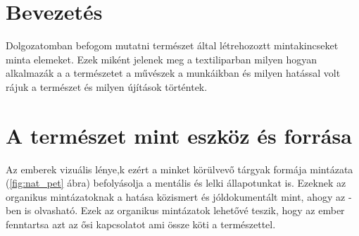 \documentclass[fontsize=12pt, appendixprefix=true]{scrreprt}
\begin{document}




\tableofcontents


\chapter{Bevezetés}
Dolgozatomban befogom mutatni természet által létrehozoztt mintakincseket minta elemeket.
Ezek miként jelenek meg a textiliparban milyen hogyan alkalmazák a a természetet a művészek a munkáikban és milyen hatással volt rájuk a természet 
és milyen újítások történtek.


\chapter{A természet mint eszköz és forrása}

Az emberek vizuális lénye,k ezért a minket körülvevő tárgyak formája mintázata (\ref{fig:nat_pet} ábra) befolyásolja a mentális és lelki állapotunkat is. Ezeknek az organikus mintázatoknak a hatása közismert és jóldokumentált mint, ahogy az \cite{jo2019physiological} -ben is olvasható. Ezek az organikus mintázatok lehetővé teszik, hogy az ember fenntartsa azt az ősi kapcsolatot ami össze köti a természettel. 
\end{document}
